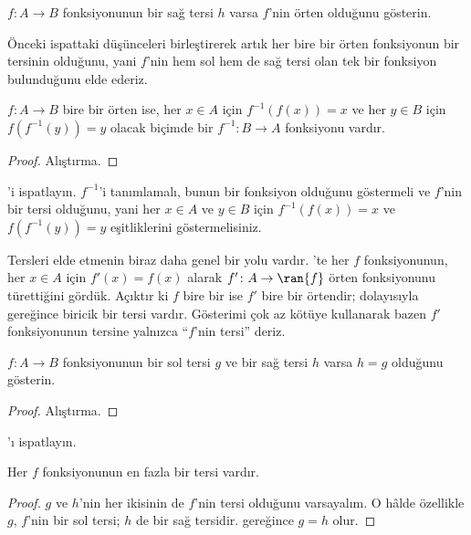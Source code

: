 \begin{prob}
$f\colon A \to B$ fonksiyonunun bir sağ tersi $h$ varsa $f$'nin örten
olduğunu gösterin.
\end{prob}

\begin{explain}
  Önceki ispattaki düşünceleri birleştirerek artık her bire bir örten
  fonksiyonun bir tersinin olduğunu, yani $f$'nin hem sol hem de sağ tersi
  olan tek bir fonksiyon bulunduğunu elde ederiz.
\end{explain}

\begin{prop}
$f\colon A \to B$ bire bir örten ise, her $x \in A$ için
$f^{-1}(f(x))=x$ ve her $y \in B$ için $f(f^{-1}(y))=y$ olacak biçimde bir
$f^{-1}\colon B \to A$ fonksiyonu vardır.
\end{prop}

\begin{proof}
Alıştırma.
\end{proof}

\begin{prob}
'i ispatlayın. $f^{-1}$'i
tanımlamalı, bunun bir fonksiyon olduğunu göstermeli ve $f$'nin bir tersi
olduğunu, yani her $x \in A$ ve $y \in B$ için $f^{-1}(f(x))=x$ ve
$f(f^{-1}(y))=y$ eşitliklerini göstermelisiniz.
\end{prob}

\begin{explain}
Tersleri elde etmenin biraz daha genel bir yolu vardır. 'te
her $f$ fonksiyonunun, her $x \in A$ için $f'(x)=f(x)$ alarak
$f' \colon A \to \ran{f}$ örten fonksiyonunu türettiğini gördük. Açıktır ki
$f$ bire bir ise $f'$ bire bir örtendir; dolayısıyla
 gereğince biricik bir tersi vardır. Gösterimi
çok az kötüye kullanarak bazen $f'$ fonksiyonunun tersine yalnızca ``$f$'nin
tersi'' deriz.
\end{explain}

\begin{prop}%
  $f\colon A \to B$ fonksiyonunun bir sol tersi $g$ ve bir sağ tersi $h$
  varsa $h=g$ olduğunu gösterin.
\end{prop}

\begin{proof}
  Alıştırma.
\end{proof}

\begin{prob}
  'ı ispatlayın.
\end{prob}

\begin{prop}
Her $f$ fonksiyonunun en fazla bir tersi vardır.
\end{prop}

\begin{proof}
  $g$ ve $h$'nin her ikisinin de $f$'nin tersi olduğunu varsayalım. O hâlde
  özellikle $g$, $f$'nin bir sol tersi; $h$ de bir sağ tersidir.
   gereğince $g=h$ olur.
\end{proof}

